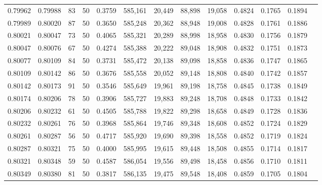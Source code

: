 \begin{tabular}{rrrrrrrrrrrrr}
0.79962 & 0.79988 &    83 &  50 &                                     0.3759 & 585,161 &  20,449 &  88,898 &  19,058 & 0.4824 & 0.1765 & 0.1894 \\
0.79989 & 0.80020 &    87 &  50 &                                     0.3650 & 585,248 &  20,362 &  88,948 &  19,008 & 0.4828 & 0.1761 & 0.1886 \\
0.80021 & 0.80047 &    73 &  50 &                                     0.4065 & 585,321 &  20,289 &  88,998 &  18,958 & 0.4830 & 0.1756 & 0.1879 \\
0.80047 & 0.80076 &    67 &  50 &                                     0.4274 & 585,388 &  20,222 &  89,048 &  18,908 & 0.4832 & 0.1751 & 0.1873 \\
0.80077 & 0.80109 &    84 &  50 &                                     0.3731 & 585,472 &  20,138 &  89,098 &  18,858 & 0.4836 & 0.1747 & 0.1865 \\
0.80109 & 0.80142 &    86 &  50 &                                     0.3676 & 585,558 &  20,052 &  89,148 &  18,808 & 0.4840 & 0.1742 & 0.1857 \\
0.80142 & 0.80173 &    91 &  50 &                                     0.3546 & 585,649 &  19,961 &  89,198 &  18,758 & 0.4845 & 0.1738 & 0.1849 \\
0.80174 & 0.80206 &    78 &  50 &                                     0.3906 & 585,727 &  19,883 &  89,248 &  18,708 & 0.4848 & 0.1733 & 0.1842 \\
0.80206 & 0.80232 &    61 &  50 &                                     0.4505 & 585,788 &  19,822 &  89,298 &  18,658 & 0.4849 & 0.1728 & 0.1836 \\
0.80232 & 0.80261 &    76 &  50 &                                     0.3968 & 585,864 &  19,746 &  89,348 &  18,608 & 0.4852 & 0.1724 & 0.1829 \\
0.80261 & 0.80287 &    56 &  50 &                                     0.4717 & 585,920 &  19,690 &  89,398 &  18,558 & 0.4852 & 0.1719 & 0.1824 \\
0.80287 & 0.80321 &    75 &  50 &                                     0.4000 & 585,995 &  19,615 &  89,448 &  18,508 & 0.4855 & 0.1714 & 0.1817 \\
0.80321 & 0.80348 &    59 &  50 &                                     0.4587 & 586,054 &  19,556 &  89,498 &  18,458 & 0.4856 & 0.1710 & 0.1811 \\
0.80349 & 0.80380 &    81 &  50 &                                     0.3817 & 586,135 &  19,475 &  89,548 &  18,408 & 0.4859 & 0.1705 & 0.1804 \\

\end{tabular}
